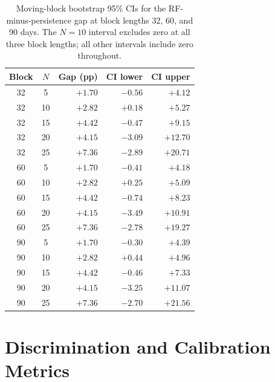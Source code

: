 \documentclass[12pt]{article}
\begin{document}
\begin{table}[H]
\centering
\caption{Moving-block bootstrap 95\% CIs for the RF-minus-persistence gap at block lengths
32, 60, and 90 days. The $N = 10$ interval excludes zero at all three block lengths; all other
intervals include zero throughout.}
\label{tab:blocklen}
\begin{tabular}{ccrrr}
\toprule
Block & $N$ & Gap (pp) & CI lower & CI upper \\
\midrule
32 & 5  & $+1.70$ & $-0.56$ & $+4.12$ \\
32 & 10 & $+2.82$ & $+0.18$ & $+5.27$ \\
32 & 15 & $+4.42$ & $-0.47$ & $+9.15$ \\
32 & 20 & $+4.15$ & $-3.09$ & $+12.70$ \\
32 & 25 & $+7.36$ & $-2.89$ & $+20.71$ \\
\midrule
60 & 5  & $+1.70$ & $-0.41$ & $+4.18$ \\
60 & 10 & $+2.82$ & $+0.25$ & $+5.09$ \\
60 & 15 & $+4.42$ & $-0.74$ & $+8.23$ \\
60 & 20 & $+4.15$ & $-3.49$ & $+10.91$ \\
60 & 25 & $+7.36$ & $-2.78$ & $+19.27$ \\
\midrule
90 & 5  & $+1.70$ & $-0.30$ & $+4.39$ \\
90 & 10 & $+2.82$ & $+0.44$ & $+4.96$ \\
90 & 15 & $+4.42$ & $-0.46$ & $+7.33$ \\
90 & 20 & $+4.15$ & $-3.25$ & $+11.07$ \\
90 & 25 & $+7.36$ & $-2.70$ & $+21.56$ \\
\bottomrule
\end{tabular}
\end{table}

\section{Discrimination and Calibration Metrics}
\label{app:aucbrier}
\end{document}
